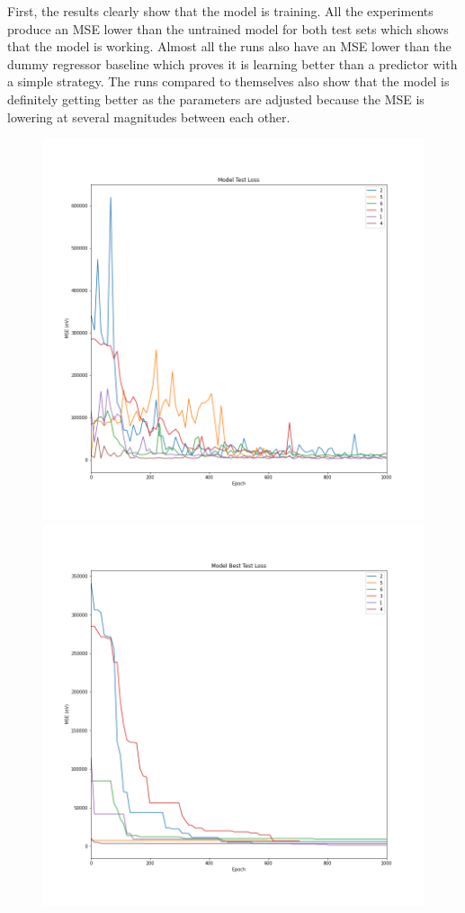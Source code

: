 \documentclass[12pt, abstract = true]{scrartcl}
\begin{document}
First, the results clearly show that the model is training. All the experiments produce an MSE lower than the untrained model for both test sets which shows that the model is working. Almost all the runs also have an MSE lower than the dummy regressor baseline which proves it is learning better than a predictor with a simple strategy. The runs compared to themselves also show that the model is definitely getting better as the parameters are adjusted because the MSE is lowering at several magnitudes between each other.


\begin{figure}
  \centering
  \includegraphics[scale=.35]{test.png}
  \includegraphics[scale=.35]{best.png}
  

\end{figure}
\end{document}
